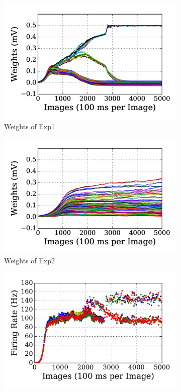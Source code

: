 \begin{figure}
	\centering
	\begin{subfigure}[t]{0.48\textwidth}
		\includegraphics[width=\textwidth]{pics_sdlm/15_exp_SRBM_teach_long/exp1_weights_s.png}
		\caption{Weights of Exp1}
	\end{subfigure}
	\begin{subfigure}[t]{0.48\textwidth}
		\includegraphics[width=\textwidth]{pics_sdlm/15_exp_SRBM_teach_long/exp2_weights_s.png}
		\caption{Weights of Exp2}
	\end{subfigure}
	\begin{subfigure}[t]{0.48\textwidth}
		\includegraphics[width=\textwidth]{pics_sdlm/15_exp_SRBM_teach_long/exp1_recon_s.pdf}

\end{subfigure}
\end{figure}
